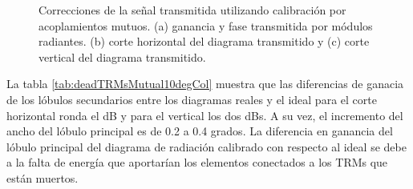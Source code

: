 \begin{figure}[H]
	\centering

	\caption{Correcciones de la señal transmitida utilizando calibración por acoplamientos mutuos. (a) ganancia y fase 
		transmitida por módulos radiantes. (b) corte horizontal del diagrama transmitido y (c) corte vertical del diagrama transmitido.}
	\label{fig:deadTRMsMutual10degCol}
\end{figure}

La tabla \ref{tab:deadTRMsMutual10degCol} muestra que las diferencias de ganacia de los lóbulos secundarios entre los diagramas 
reales y el ideal para el corte horizontal ronda el dB y para el vertical los dos dBs. A su vez, el incremento del ancho del 
lóbulo principal es de 0.2 a 0.4 grados. La diferencia en ganancia del lóbulo principal del diagrama de radiación calibrado 
con respecto al ideal se debe a la falta de energía que aportarían los elementos conectados a los TRMs que están muertos.

